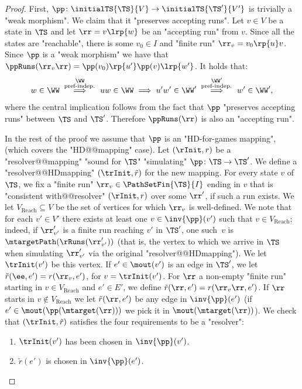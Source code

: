 \documentclass{theoretics}
\begin{document}
\HDmappingsPrefIndep*
\begin{proof}
	First, $\pp\colon \initialTS{\TS}{V} \to \initialTS{\TS'}{V'}$ is trivially a "weak morphism". We claim that it "preserves accepting runs". Let $v\in V$ be a state in $\TS$ and let $\rr = v \lrp{w}$ be an "accepting run" from $v$. Since all the states are "reachable", there is some $v_0\in I$ and "finite run" $\rr_v = v_0 \rp{u} v$. Since $\pp$ is a "weak morphism" we have that $\ppRuns(\rr_v\rr) = \pp(v_0) \rp{u'} \pp(v) \lrp{w'}$. It holds that:
	\[ w \in \WW \overset{\begin{subarray}{c}
			\WW \\
			\text{ pref-indep. }
		\end{subarray}
	}\implies uw\in \WW \implies u'w'\in \WW' \overset{\begin{subarray}{c}
			\WW' \\
			\text{ pref-indep. }
		\end{subarray}
	}\implies w'\in \WW', \]
	where the central implication follows from the fact that $\pp$ "preserves accepting runs" between $\TS$ and $\TS'$. Therefore $\ppRuns(\rr)$ is also an "accepting run".
	
	In the rest of the proof we assume that $\pp$ is an "HD-for-games mapping", (which covers the "HD@@mapping" case).
	Let $(\rInit, r)$ be a "resolver@@mapping" "sound for $\TS$" "simulating"  $\pp\colon \TS \to \TS'$. We define a "resolver@@HDmapping" $(\trInit, \tilde{r})$ for the new mapping. 
	For every state $v$ of $\TS$, we fix a "finite run" $\rr_{v}\in \PathSetFin{\TS}{I}$ ending in $v$ that is "consistent with@@resolver" $(\rInit,r)$ over some $\rr'$, if such a run exists.  We let $V_{\mathrm{Reach}}\subseteq V$ be the set of vertices for which $\rr_{v}$ is well-defined. We note that for each $v'\in V'$ there exists at least one $v\in \inv{\pp}(v')$ such that $v\in V_{\mathrm{Reach}}$; indeed, if $\rr'_{v'}$ is a finite run reaching $v'$ in $\TS'$, one such~$v$ is $\mtargetPath(\rRuns(\rr_{v'}'))$ (that is, the vertex to which we arrive in $\TS$ when simulating $\rr_{v'}'$ via the original "resolver@@HDmapping"). We let $\trInit(v')$ be this vertex. 
	If $e'\in \mout(v')$ is an edge in $\TS'$, we let $\tilde{r}(\ee, e')= r(\rr_v,e')$, for $v=\trInit(v')$.
	For $\rr$ a non-empty "finite run" starting in $v\in V_{\mathrm{Reach}}$ and $e'\in E'$, we define $\tilde{r}(\rr, e')= r(\rr_{v}\rr, e')$. If $\rr$ starts in $v\notin V_{\mathrm{Reach}}$ we let $\tilde{r}(\rr, e')$ be any edge in $\inv{\pp}(e')$ (if $e'\in \mout(\pp(\mtarget(\rr)))$ we pick it in $\mout(\mtarget(\rr))$). We check that $(\trInit, \tilde{r})$ satisfies the four requirements to be a "resolver":
	\begin{enumerate}
		\item $\trInit(v')$ has been chosen in $\inv{\pp}(v')$.
		\item $\tilde{r}(e')$ is chosen in $\inv{\pp}(e')$.
		

\end{enumerate}
\end{proof}
\end{document}
